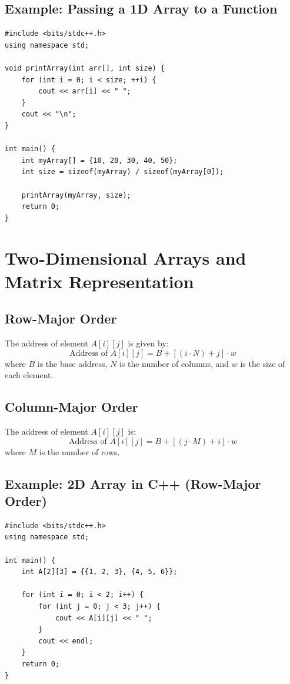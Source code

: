\subsection*{Example: Passing a 1D Array to a Function}
\begin{lstlisting}[style=cppstyle, caption=Passing Array to Function]
#include <bits/stdc++.h>
using namespace std;

void printArray(int arr[], int size) {
    for (int i = 0; i < size; ++i) {
        cout << arr[i] << " ";
    }
    cout << "\n";
}

int main() {
    int myArray[] = {10, 20, 30, 40, 50};
    int size = sizeof(myArray) / sizeof(myArray[0]);

    printArray(myArray, size);
    return 0;
}
\end{lstlisting}

\section{Two-Dimensional Arrays and Matrix Representation}
\subsection*{Row-Major Order}
The address of element \(A[i][j]\) is given by:
\[
\text{Address of } A[i][j] = B + [(i \cdot N) + j] \cdot w
\]
where \(B\) is the base address, \(N\) is the number of columns, and \(w\) is the size of each element.

\subsection*{Column-Major Order}
The address of element \(A[i][j]\) is:
\[
\text{Address of } A[i][j] = B + [(j \cdot M) + i] \cdot w
\]
where \(M\) is the number of rows.

\subsection*{Example: 2D Array in C++ (Row-Major Order)}
\begin{lstlisting}[style=cppstyle, caption=2D Array in Row-Major Order]
#include <bits/stdc++.h>
using namespace std;

int main() {
    int A[2][3] = {{1, 2, 3}, {4, 5, 6}};
    
    for (int i = 0; i < 2; i++) {
        for (int j = 0; j < 3; j++) {
            cout << A[i][j] << " ";
        }
        cout << endl;
    }
    return 0;
}
\end{lstlisting}

